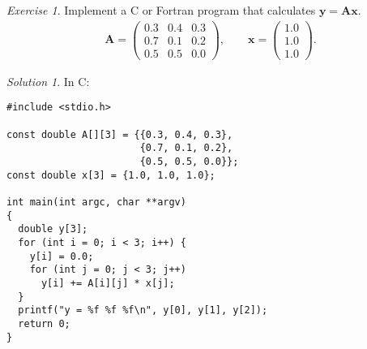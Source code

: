 \documentclass[onecolumn, oneside, a4paper, 11pt]{memoir}
\theoremstyle{remark}
\newtheorem{ex}{Exercise}
\newtheorem*{sol}{Solution}
\begin{document}
\begin{ex}
  Implement a C or Fortran program that calculates $\bm y = \bm A \bm x$.
  \begin{align*}
    \bm A =
    \begin{pmatrix}
      0.3 & 0.4 & 0.3 \\
      0.7 & 0.1 & 0.2 \\
      0.5 & 0.5 & 0.0
    \end{pmatrix}, \qquad \bm x = \begin{pmatrix} 1.0 \\ 1.0 \\ 1.0 \end{pmatrix}.
  \end{align*}
\end{ex}
\newpage
\begin{sol}
  In C:

  \begin{lstlisting}[style=c]
#include <stdio.h>

const double A[][3] = {{0.3, 0.4, 0.3},
                       {0.7, 0.1, 0.2},
                       {0.5, 0.5, 0.0}};
const double x[3] = {1.0, 1.0, 1.0};

int main(int argc, char **argv)
{
  double y[3];
  for (int i = 0; i < 3; i++) {
    y[i] = 0.0;
    for (int j = 0; j < 3; j++)
      y[i] += A[i][j] * x[j];
  }
  printf("y = %f %f %f\n", y[0], y[1], y[2]);
  return 0;
}
  \end{lstlisting}
\end{sol}
\end{document}
